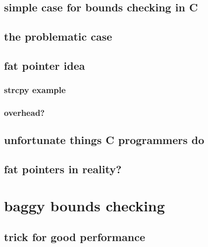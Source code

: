 

\subsection{simple case for bounds checking in C}


\subsection{the problematic case}


\subsection{fat pointer idea}


\subsubsection{strcpy example}


\subsubsection{overhead?}


\subsection{unfortunate things C programmers do}


\subsection{fat pointers in reality?}


\section{baggy bounds checking}


\subsection{trick for good performance}


